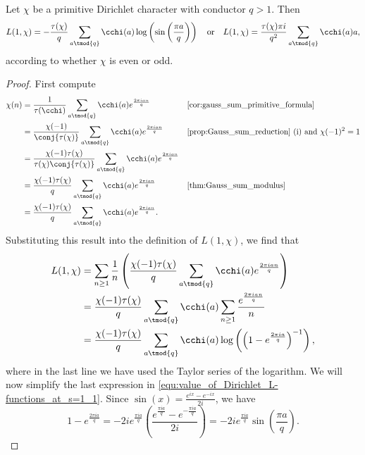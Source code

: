    \begin{theorem}\label{thm:Value_of_Dirichlet_L-functions_at_s=1}
      Let $\chi$ be a primitive Dirichlet character with conductor $q > 1$. Then
      \[
        L(1,\chi) = -\frac{\tau(\chi)}{q}\sum_{a \tmod{q}}\cchi(a)\log\left(\sin\left(\frac{\pi a}{q}\right)\right) \quad \text{or} \quad L(1,\chi) = \frac{\tau(\chi)\pi i}{q^{2}}\sum_{a \tmod{q}}\cchi(a)a,
      \]
      according to whether $\chi$ is even or odd.
    \end{theorem}
    \begin{proof}
      First compute
      \begin{align*}
        \chi(n) &= \frac{1}{\tau(\cchi)}\sum_{a \tmod{q}}\cchi(a)e^{\frac{2\pi ian}{q}} && \text{\cref{cor:gauss_sum_primitive_formula}} \\
        &= \frac{\chi(-1)}{\conj{\tau(\chi)}}\sum_{a \tmod{q}}\cchi(a)e^{\frac{2\pi ian}{q}} && \text{\cref{prop:Gauss_sum_reduction} (i) and $\chi(-1)^{2} = 1$} \\
        &= \frac{\chi(-1)\tau(\chi)}{\tau(\chi)\conj{\tau(\chi)}}\sum_{a \tmod{q}}\cchi(a)e^{\frac{2\pi ian}{q}} \\
        &= \frac{\chi(-1)\tau(\chi)}{q}\sum_{a \tmod{q}}\cchi(a)e^{\frac{2\pi ian}{q}} && \text{\cref{thm:Gauss_sum_modulus}} \\
        &= \frac{\chi(-1)\tau(\chi)}{q}\sum_{a \tmod{q}}\cchi(a)e^{\frac{2\pi ian}{q}}.
      \end{align*}
      Substituting this result into the definition of $L(1,\chi)$, we find that
      \begin{equation}\label{equ:value_of_Dirichlet_L-functions_at_s=1_1}
        \begin{aligned}
          L(1,\chi) &= \sum_{n \ge 1}\frac{1}{n}\left(\frac{\chi(-1)\tau(\chi)}{q}\sum_{a \tmod{q}}\cchi(a)e^{\frac{2\pi ian}{q}}\right) \\
          &= \frac{\chi(-1)\tau(\chi)}{q}\sum_{a \tmod{q}}\cchi(a)\sum_{n \ge 1}\frac{e^{\frac{2\pi ian}{q}}}{n} \\
          &= \frac{\chi(-1)\tau(\chi)}{q}\sum_{a \tmod{q}}\cchi(a)\log\left(\left(1-e^{\frac{2\pi ia}{q}}\right)^{-1}\right),
        \end{aligned}
      \end{equation}
      where in the last line we have used the Taylor series of the logarithm. We will now simplify the last expression in \cref{equ:value_of_Dirichlet_L-functions_at_s=1_1}. Since $\sin(x) = \frac{e^{ix}-e^{-ix}}{2i}$, we have
      \[
        1-e^{\frac{2\pi ia}{q}} = -2ie^{\frac{\pi ia}{q}}\left(\frac{e^{\frac{\pi ia}{q}}-e^{-\frac{\pi ia}{q}}}{2i}\right) = -2ie^{\frac{\pi ia}{q}}\sin\left(\frac{\pi a}{q}\right).
\]
\end{proof}
